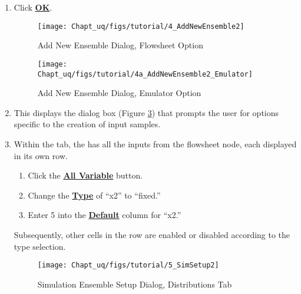 \begin{enumerate}
\item{Click \textbf{\underline{OK}}.}
\begin{figure}[H]
\centering \texttt{[image: Chapt\_uq/figs/tutorial/4\_AddNewEnsemble2]}
\caption{Add New Ensemble Dialog, Flowsheet Option}
\label{fig:uqt_addnew}
\end{figure}
\begin{figure}[H]
\centering
\texttt{[image: Chapt\_uq/figs/tutorial/4a\_AddNewEnsemble2\_Emulator]}
\caption{Add New Ensemble Dialog, Emulator Option}
\label{fig:uqt_addnew_emulator}
\end{figure}
\item{This displays the  dialog box (Figure
  \ref{fig:uqt_sim}) that prompts the user for options specific to the
  creation of input samples.}
\item{Within the  tab, the 
  has all the inputs from the flowsheet node, each displayed in its own
  row.}
\begin{enumerate}
\item{Click the \textbf{\underline{All Variable}} button.}
\item{Change the \textbf{\underline{Type}} of ``x2'' to ``fixed.''}
\item{Enter 5 into the \textbf{\underline{Default}} column for ``x2.''}
\end{enumerate}
Subsequently, other cells in the row are enabled or disabled according to the type selection.
\begin{figure}[H]
\centering \texttt{[image: Chapt\_uq/figs/tutorial/5\_SimSetup2]}
\caption{Simulation Ensemble Setup Dialog, Distributions Tab}
\label{fig:uqt_sim}
\end{figure}



\end{enumerate}
